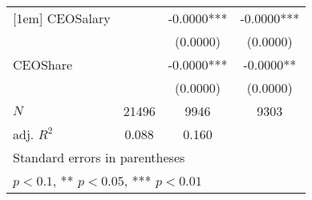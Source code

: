 \begin{table}[htbp]
\begin{tabular}{l*{3}{c}}
[1em]
CEOSalary   &               &     -0.0000***&     -0.0000***\\
            &               &    (0.0000)   &    (0.0000)   \\
[1em]
CEOShare    &               &     -0.0000***&     -0.0000** \\
            &               &    (0.0000)   &    (0.0000)   \\
\hline
\(N\)       &       21496   &        9946   &        9303   \\
adj. \(R^{2}\)&       0.088   &       0.160   &               \\
\hline\hline
\multicolumn{4}{l}{\footnotesize Standard errors in parentheses}\\
\multicolumn{4}{l}{\footnotesize * \(p<0.1\), ** \(p<0.05\), *** \(p<0.01\)}\\
\end{tabular}
\end{table}
